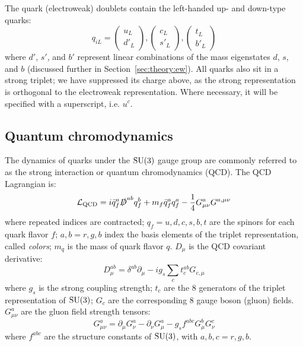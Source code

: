 The quark (electroweak) doublets contain the left-handed up- and down-type quarks:
\begin{equation}
    q_{iL} = 
    \left(\begin{matrix} u_L \\ d'_L \end{matrix}\right),
    \left(\begin{matrix} c_L \\ s'_L \end{matrix}\right),
    \left(\begin{matrix} t_L \\ b'_L \end{matrix}\right)
\end{equation}
where $d'$, $s'$, and $b'$ represent linear combinations of the mass eigenstates $d$, $s$, and $b$ (discussed further in Section~\ref{sec:theory:ew}).
All quarks also sit in a strong triplet; we have suppressed its charge above, as the strong representation is orthogonal to the electroweak representation.
Where necessary, it will be specified with a superscript, i.e. $u^{c}$.

\subsection{Quantum chromodynamics}
The dynamics of quarks under the $\operatorname{\mathrm{SU}}(3)$ gauge group are commonly referred to as the strong interaction or quantum chromodynamics (QCD).
The QCD Lagrangian is:
\begin{equation}
    \mathcal{L}_\mathrm{QCD} = 
        i \bar q^{a}_f \slashed D^{ab} q^{b}_f  
        + m_f \bar{q}^{a}_f q^{a}_f
        - \frac{1}{4} G^{a}_{\mu\nu} G^{a,\mu\nu}
    \label{eq:theory:lqcd}
\end{equation}
where repeated indices are contracted; $q_f=u,d,c,s,b,t$ are the spinors for each quark flavor $f$; $a,b=r,g,b$ index the basis elements of the triplet representation, called \emph{colors}; $m_q$ is the mass of quark flavor $q$.
$D_\mu$ is the QCD covariant derivative:
\begin{equation}
    D_\mu^{ab} = \delta^{ab} \partial_\mu - i g_s \sum_c t^{ab}_c G_{c,\mu}
\end{equation}
where $g_s$ is the strong coupling strength; $t_c$ are the 8 generators of the triplet representation of $\operatorname{\mathrm{SU}}(3)$; $G_c$ are the corresponding 8 gauge boson (gluon) fields. 
$G^a_{\mu\nu}$ are the gluon field strength tensors:
\begin{equation}
    G^a_{\mu\nu} = \partial_\mu G_\nu^a - \partial_\nu G_\mu^a - g_s f^{abc} G_\mu^b G_\nu^c
\end{equation}
where $f^{abc}$ are the structure constants of $\operatorname{\mathrm{SU}}(3)$, with $a,b,c=r,g,b$.

